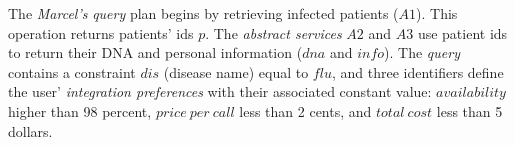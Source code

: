 The \textit{Marcel's }\textit{query} plan begins by retrieving infected patients ($A1$). This operation returns patients' ids $p$. The \textit{abstract services} $A2$ and $A3$ use patient ids to return their DNA and personal information ($dna$ and $info$).
The \textit{query} contains a constraint $dis$ (disease name) equal to $flu$, and three identifiers define the user' \textit{integration preferences} with their associated constant value: $availability$ higher than 98 percent, $price \ per \ call$ less than 2 cents, and $total \ cost$ less than 5 dollars.
%
%



